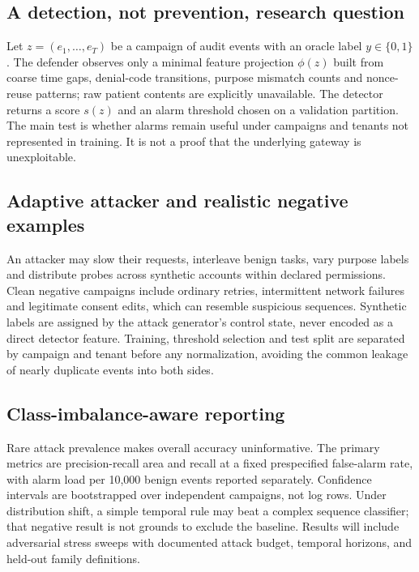 \documentclass[11pt,a4paper]{article}
\begin{document}
\subsection{A detection, not prevention, research question}
Let $z=(e_1,\ldots,e_T)$ be a campaign of audit events with an oracle label $y\in\{0,1\}$. The defender observes only a minimal feature projection $\phi(z)$ built from coarse time gaps, denial-code transitions, purpose mismatch counts and nonce-reuse patterns; raw patient contents are explicitly unavailable. The detector returns a score $s(z)$ and an alarm threshold chosen on a validation partition. The main test is whether alarms remain useful under campaigns and tenants not represented in training. It is not a proof that the underlying gateway is unexploitable.

\subsection{Adaptive attacker and realistic negative examples}
An attacker may slow their requests, interleave benign tasks, vary purpose labels and distribute probes across synthetic accounts within declared permissions. Clean negative campaigns include ordinary retries, intermittent network failures and legitimate consent edits, which can resemble suspicious sequences. Synthetic labels are assigned by the attack generator's control state, never encoded as a direct detector feature. Training, threshold selection and test split are separated by campaign and tenant before any normalization, avoiding the common leakage of nearly duplicate events into both sides.

\subsection{Class-imbalance-aware reporting}
Rare attack prevalence makes overall accuracy uninformative. The primary metrics are precision-recall area and recall at a fixed prespecified false-alarm rate, with alarm load per 10,000 benign events reported separately. Confidence intervals are bootstrapped over independent campaigns, not log rows. Under distribution shift, a simple temporal rule may beat a complex sequence classifier; that negative result is not grounds to exclude the baseline. Results will include adversarial stress sweeps with documented attack budget, temporal horizons, and held-out family definitions.
\end{document}

